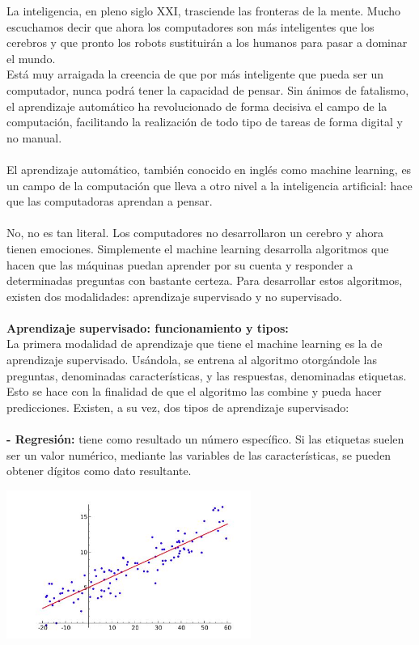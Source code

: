 \documentclass[%
 reprint,
 amsmath,amssymb,
 aps,
]{revtex4-1}
\begin{document}
{La inteligencia, en pleno siglo XXI, trasciende las fronteras de la mente. Mucho escuchamos decir que ahora los computadores son más inteligentes que los cerebros y que pronto los robots sustituirán a los humanos para pasar a dominar el mundo.\\
Está muy arraigada la creencia de que por más inteligente que pueda ser un computador, nunca podrá tener la capacidad de pensar. Sin ánimos de fatalismo, el aprendizaje automático ha revolucionado de forma decisiva el campo de la computación, facilitando la realización de todo tipo de tareas de forma digital y no manual. \\
\\El aprendizaje automático, también conocido en inglés como machine learning, es un campo de la computación que lleva a otro nivel a la inteligencia artificial: hace que las computadoras aprendan a pensar.\\
\\
No, no es tan literal. Los computadores no desarrollaron un cerebro y ahora tienen emociones. Simplemente el machine learning desarrolla algoritmos que hacen que las máquinas puedan aprender por su cuenta y responder a determinadas preguntas con bastante certeza. Para desarrollar estos algoritmos, existen dos modalidades: aprendizaje supervisado y no supervisado.\\
\\
  \textbf{Aprendizaje supervisado: funcionamiento y tipos:} \\
La primera modalidad de aprendizaje que tiene el machine learning es la de aprendizaje supervisado. Usándola, se entrena al algoritmo otorgándole las preguntas, denominadas características, y las respuestas, denominadas etiquetas. Esto se hace con la finalidad de que el algoritmo las combine y pueda hacer predicciones.
Existen, a su vez, dos tipos de aprendizaje supervisado:
 \\
 \\
 \textbf{-  Regresión: }  tiene como resultado un número específico. Si las etiquetas suelen ser un valor numérico, mediante las variables de las características, se pueden obtener dígitos como dato resultante.
 \begin{center}
\includegraphics[width=8cm]{./Imagenes/regresion10}
\end{center}

}
\end{document}
